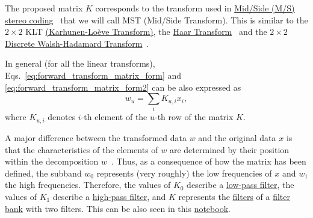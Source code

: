The proposed matrix $K$ corresponds to the transform used in
\href{https://en.wikipedia.org/wiki/Joint_encoding#M/S_stereo_coding}{Mid/Side
  (M/S) stereo coding}~\cite{bosi2003intro} that we will call MST
(Mid/Side Transform). This is similar to the $2\times 2$ KLT
\href{http://fourier.eng.hmc.edu/e161/lectures/klt/node3.html}{(Karhunen-Lo\`eve
  Transform)}, the
\href{http://wavelets.pybytes.com/wavelet/haar/}{Haar
  Transform}~\cite{vetterli1995wavelets} and the $2\times 2$
\href{https://en.wikipedia.org/wiki/Hadamard_transform}{Discrete
  Walsh-Hadamard Transform}~\cite{sayood2017introduction}.

In general (for all the linear transforms),
Eqs.~\ref{eq:forward_transform_matrix_form} and
\ref{eq:forward_transform_matrix_form2} can be also expressed as
\begin{equation}
  w_u = \sum_i K_{u,i}x_i,
  \label{eq:forward_transform_linear_combination_form}
\end{equation}
where $K_{u,i}$ denotes $i$-th element of the $u$-th row of the matrix
$K$.

A major difference between the transformed data $w$ and the original
data $x$ is that the characteristics of the elements of $w$ are
determined by their position within the decomposition
$w$~\cite{sayood2017introduction}. Thus, as a consequence of how the
matrix has been defined, the subband $w_0$ represents (very roughly)
the low frequencies of $x$ and $w_1$ the high frequencies. Therefore,
the values of $K_0$ describe a
\href{https://en.wikipedia.org/wiki/Low-pass_filter}{low-pass filter},
the values of $K_1$ describe a
\href{https://en.wikipedia.org/wiki/High-pass_filter}{high-pass
  filter}, and $K$ represents the
\href{https://en.wikipedia.org/wiki/Digital_filter}{filters} of a
\href{https://en.wikipedia.org/wiki/Filter_bank}{filter bank} with two
filters. This can be also seen in this
\href{https://github.com/Tecnologias-multimedia/intercom/blob/master/docs/stereo_transforms_RD.ipynb}{notebook}.

